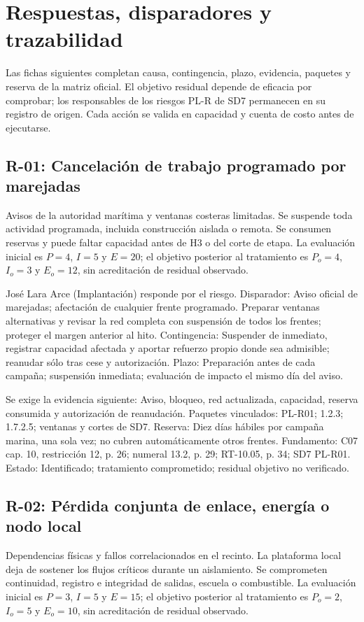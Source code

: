 \section{Respuestas, disparadores y trazabilidad}
Las fichas siguientes completan causa, contingencia, plazo, evidencia, paquetes y reserva de la matriz oficial. El objetivo residual depende de eficacia por comprobar; los responsables de los riesgos PL-R de SD7 permanecen en su registro de origen. Cada acción se valida en capacidad y cuenta de costo antes de ejecutarse.

\subsection{R-01: Cancelación de trabajo programado por marejadas}
Avisos de la autoridad marítima y ventanas costeras limitadas. Se suspende toda actividad programada, incluida construcción aislada o remota. Se consumen reservas y puede faltar capacidad antes de H3 o del corte de etapa. La evaluación inicial es $P=4$, $I=5$ y $E=20$; el objetivo posterior al tratamiento es $P_o=4$, $I_o=3$ y $E_o=12$, sin acreditación de residual observado.

José Lara Arce (Implantación) responde por el riesgo. Disparador: Aviso oficial de marejadas; afectación de cualquier frente programado. Preparar ventanas alternativas y revisar la red completa con suspensión de todos los frentes; proteger el margen anterior al hito. Contingencia: Suspender de inmediato, registrar capacidad afectada y aportar refuerzo propio donde sea admisible; reanudar sólo tras cese y autorización. Plazo: Preparación antes de cada campaña; suspensión inmediata; evaluación de impacto el mismo día del aviso.

Se exige la evidencia siguiente: Aviso, bloqueo, red actualizada, capacidad, reserva consumida y autorización de reanudación. Paquetes vinculados: PL-R01; 1.2.3; 1.7.2.5; ventanas y cortes de SD7. Reserva: Diez días hábiles por campaña marina, una sola vez; no cubren automáticamente otros frentes. Fundamento: C07 cap. 10, restricción 12, p. 26; numeral 13.2, p. 29; RT-10.05, p. 34; SD7 PL-R01. Estado: Identificado; tratamiento comprometido; residual objetivo no verificado. \parencite[cap.~10, restricción 12, p.~26; numeral 13.2, p.~29; RT-10.05, p.~34]{sd8-c07}

\subsection{R-02: Pérdida conjunta de enlace, energía o nodo local}
Dependencias físicas y fallos correlacionados en el recinto. La plataforma local deja de sostener los flujos críticos durante un aislamiento. Se comprometen continuidad, registro e integridad de salidas, escuela o combustible. La evaluación inicial es $P=3$, $I=5$ y $E=15$; el objetivo posterior al tratamiento es $P_o=2$, $I_o=5$ y $E_o=10$, sin acreditación de residual observado.

